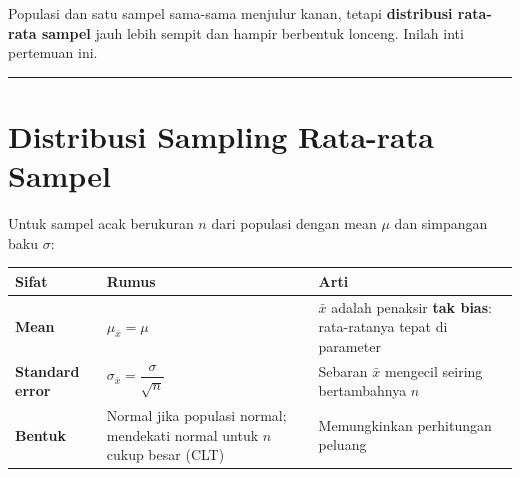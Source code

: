 \documentclass[
  indonesian,
  letterpaper,
]{book}
\newcounter{none} %
\begin{document}
Populasi dan satu sampel sama-sama menjulur kanan, tetapi
\textbf{distribusi rata-rata sampel} jauh lebih sempit dan hampir
berbentuk lonceng. Inilah inti pertemuan ini.

\begin{center}\rule{0.5\linewidth}{0.5pt}\end{center}

\section{Distribusi Sampling Rata-rata
Sampel}\label{distribusi-sampling-rata-rata-sampel}

Untuk sampel acak berukuran \(n\) dari populasi dengan mean \(\mu\) dan
simpangan baku \(\sigma\):

{\def\LTcaptype{none} %
\begin{longtable}[]{@{}
  >{\raggedright\arraybackslash}p{}
  >{\raggedright\arraybackslash}p{}
  >{\raggedright\arraybackslash}p{}@{}}
\toprule\noalign{}
\begin{minipage}[b]{\linewidth}\raggedright
Sifat
\end{minipage} & \begin{minipage}[b]{\linewidth}\raggedright
Rumus
\end{minipage} & \begin{minipage}[b]{\linewidth}\raggedright
Arti
\end{minipage} \\
\midrule\noalign{}
\endhead
\bottomrule\noalign{}
\endlastfoot
\textbf{Mean} & \(\mu_{\bar{x}} = \mu\) & \(\bar{x}\) adalah penaksir
\textbf{tak bias}: rata-ratanya tepat di parameter \\
\textbf{Standard error} &
\(\sigma_{\bar{x}} = \dfrac{\sigma}{\sqrt{n}}\) & Sebaran \(\bar{x}\)
mengecil seiring bertambahnya \(n\) \\
\textbf{Bentuk} & Normal jika populasi normal; mendekati normal untuk
\(n\) cukup besar (CLT) & Memungkinkan perhitungan peluang \\
\end{longtable}
}
\end{document}
